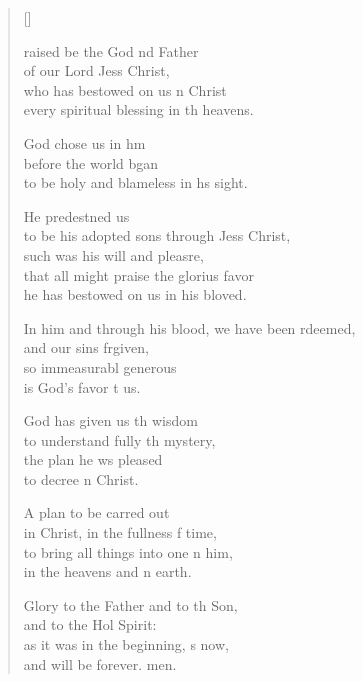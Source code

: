 \settowidth{\versewidth}{In him and through his blood, we have been redeemed, *}
\begin{verse}[\versewidth]
  \begin{patverse}
raised be the God nd Father\Med\\
of our Lord Jess Christ,\\
who has bestowed on us n Christ\Med\\
every spiritual blessing in th heavens.

God chose us in h\pointup{\i}m\Flex\\
before the world bgan\Med\\
to be holy and blameless in h\pointup{\i}s sight.

He predestned us\Med\\
to be his adopted sons through Jess Christ,\\
such was his will and pleasre,\Flex\\
that all might praise the glorius favor\Med\\
he has bestowed on us in his bloved.

In him and through his blood, we have been rdeemed,\Med\\
and our sins frgiven,\\
so immeasurabl generous\Med\\
is God’s favor t us.

God has given us th wisdom\Med\\
to understand fully th mystery,\\
the plan he ws pleased\Med\\
to decree \pointup{\i}n Christ.

A plan to be carred out\Med\\
in Christ, in the fullness f time,\\
to bring all things into one n him,\Med\\
in the heavens and n earth.

Glory to the Father and to th Son,\Med\\
and to the Hol Spirit:\\
as it was in the beginning, s now,\Med\\
and will be forever. men.
  \end{patverse}
\end{verse}
